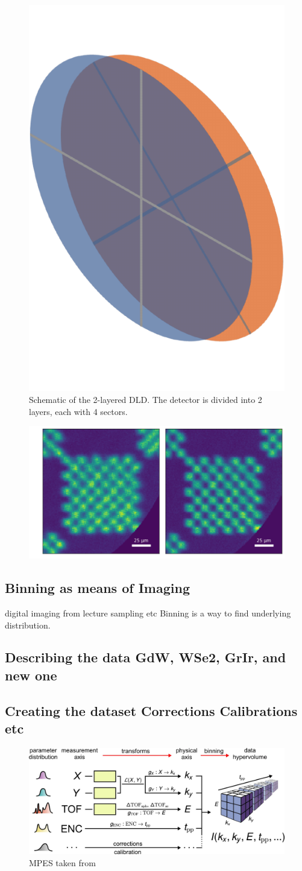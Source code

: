 \begin{figure}
    \centering
    \includegraphics[width=0.3\linewidth]{images/sectors_figure.pdf}
    \caption{Schematic of the 2-layered DLD. The detector is divided into 2 layers, each with 4 sectors.}
    \label{fig:sectors}
\end{figure}

\begin{figure}
    \includegraphics[width=1\linewidth]{images/chessy_deblurring_merged_events.png}
\end{figure}

\subsection{Binning as means of Imaging}
digital imaging from lecture
sampling etc
Binning is a way to find underlying distribution.


\subsection{Describing the data GdW, WSe2, GrIr, and new one}

\subsection{Creating the dataset Corrections Calibrations etc}
\begin{figure}
    \centering
    \includegraphics[width=1\linewidth]{images/2024-08-25-22-36-44.png}
    \caption{MPES taken from \cite{xianOpensourceEndtoendWorkflow2020}}
\end{figure}